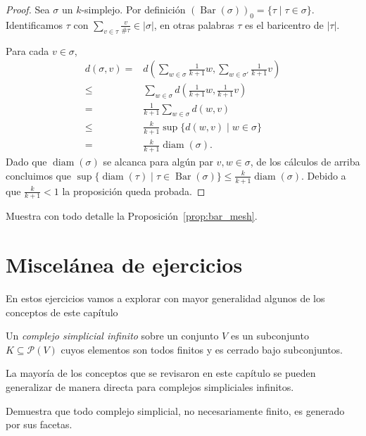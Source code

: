 \documentclass{standalone}
\begin{document}
	\begin{proof}
		Sea $\sigma$ un $k$-simplejo. Por definición $(\operatorname{Bar}(\sigma))_{0}=\{\tau\mid\tau\in \sigma\}$. Identificamos $\tau$ con $\sum_{v\in\tau}\frac{v}{\#\tau}\in|\sigma|$, en otras palabras $\tau$ es el baricentro de $|\tau|$.
		
		Para cada $v\in \sigma$, \begin{align}
			d(\sigma,v)=&d(\sum_{w\in\sigma}\frac{1}{k+1}w,\sum_{w\in\sigma'}\frac{1}{k+1}v)\\
			\leq& \sum_{w\in\sigma}d(\frac{1}{k+1}w,\frac{1}{k+1}v)\\
			=&\frac{1}{k+1}\sum_{w\in\sigma}d(w,v)\\
			\leq&\frac{k}{k+1}\sup\{d(w,v)\mid w\in\sigma\}\\
			=&\frac{k}{k+1}\operatorname{diam}(\sigma).		
		\end{align}
		Dado que $\operatorname{diam}(\sigma)$ se alcanca para algún par $v,w\in\sigma$, de los cálculos de arriba concluimos que $\sup\{\operatorname{diam}(\tau)\mid\tau\in\operatorname{Bar}(\sigma)\}\leq\frac{k}{k+1}\operatorname{diam}(\sigma)$. Debido a que $\frac{k}{k+1}<1$ la proposición queda probada.
	\end{proof}
	\begin{exercise}
		Muestra con todo detalle la Proposición~\ref{prop:bar_mesh}.
	\end{exercise}
	
	\section{Miscelánea de ejercicios}
	
	En estos ejercicios vamos a explorar con mayor generalidad algunos de los conceptos de este capítulo
	
	\begin{definition}\label{def:infinite_simplicial_complex}
		Un \emph{complejo simplicial infinito} sobre un conjunto $V$ es un subconjunto $K\subseteq\mathcal{P}(V)$ cuyos elementos son todos finitos y es cerrado bajo subconjuntos.
	\end{definition}
	
	La mayoría de los conceptos que se revisaron en este capítulo se pueden generalizar de manera directa para complejos simpliciales infinitos.
	
	\begin{exercise}
		Demuestra que todo complejo simplicial, no necesariamente finito, es generado por sus facetas.
	\end{exercise}
	
\end{document}
